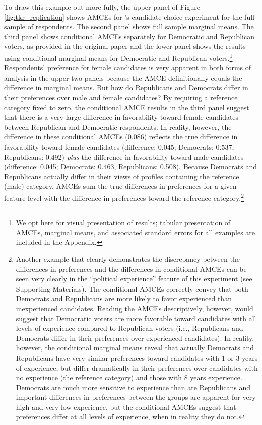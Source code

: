 \documentclass[a4paper,12pt]{article}\usepackage[]{graphicx}\usepackage[]{color}
\begin{document}
To draw this example out more fully, the upper panel of Figure \ref{fig:tkr_replication} shows AMCEs for \citeauthor{TeeleKallaRosenbluth2018}'s candidate choice experiment for the full sample of respondents. The second panel shows full sample marginal means. The third panel shows conditional AMCEs separately for Democratic and Republican voters, as provided in the original paper and the lower panel shows the results using conditional marginal means for Democratic and Republican voters.\footnote{We opt here for visual presentation of results; tabular presentation of AMCEs, marginal means, and associated standard errors for all examples are included in the Appendix.} Respondents' preference for female candidates is very apparent in both forms of analysis in the upper two panels because the AMCE definitionally equals the difference in marginal means. But how do Republicans and Democrats differ in their preferences over male and female candidates? By requiring a reference category fixed to zero, the conditional AMCE results in the third panel suggest that there is a very large difference in favorability toward female candidates between Republican and Democratic respondents. In reality, however, the difference in these conditional AMCEs (0.086) reflects the true difference in favorability toward female candidates (difference: 0.045; Democrats: 0.537, Republicans: 0.492) \textit{plus} the difference in favorability toward male candidates (difference: 0.045; Democrats: 0.463, Republicans: 0.508). Because Democrats and Republicans actually differ in their views of profiles containing the reference (male) category, AMCEs sum the true differences in preferences for a given feature level with the difference in preferences toward the reference category.\footnote{Another example that clearly demonstrates the discrepancy between the differences in preferences and the differences in conditional AMCEs can be seen very clearly in the ``political experience'' feature of this experiment (see Supporting Materials). The conditional AMCEs correctly convey that both Democrats and Republicans are more likely to favor experienced than inexperienced candidates. Reading the AMCEs descriptively, however, would suggest that Democratic voters are more favorable toward candidates with all levels of experience compared to Republican voters (i.e., Republicans and Democrats differ in their preferences over experienced candidates). In reality, however, the conditional marginal means reveal that actually Democrats and Republicans have very similar preferences toward candidates with 1 or 3 years of experience, but differ dramatically in their preferences over candidates with no experience (the reference category) and those with 8 years experience. Democrats are much more sensitive to experience than are Republicans and important differences in preferences between the groups are apparent for very high and very low experience, but the conditional AMCEs suggest that preferences differ at all levels of experience, when in reality they do not.}
\end{document}
